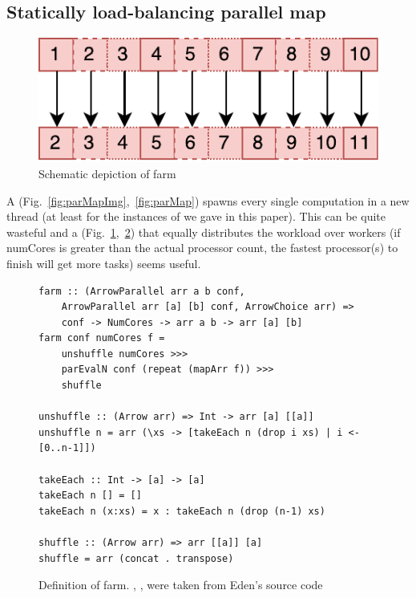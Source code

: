 \subsection{Statically load-balancing parallel map}
\begin{figure}[h]
	\includegraphics[scale=0.7]{images/farm}
	\caption{Schematic depiction of farm}
	\label{fig:farmImg}
\end{figure}
A  (Fig.~\ref{fig:parMapImg},~\ref{fig:parMap}) spawns every single computation in a new thread (at least for the instances of  we gave in this paper). This can be quite wasteful and a  (Fig.~\ref{fig:farmImg},~\ref{fig:farm}) that equally distributes the workload over  workers (if numCores is greater than the actual processor count, the fastest processor(s) to finish will get more tasks) seems useful.
\begin{figure}[h]
\begin{lstlisting}[frame=htrbl]
farm :: (ArrowParallel arr a b conf,
	ArrowParallel arr [a] [b] conf, ArrowChoice arr) =>
	conf -> NumCores -> arr a b -> arr [a] [b]
farm conf numCores f =
	unshuffle numCores >>>
	parEvalN conf (repeat (mapArr f)) >>>
	shuffle

unshuffle :: (Arrow arr) => Int -> arr [a] [[a]]
unshuffle n = arr (\xs -> [takeEach n (drop i xs) | i <- [0..n-1]])

takeEach :: Int -> [a] -> [a]
takeEach n [] = []
takeEach n (x:xs) = x : takeEach n (drop (n-1) xs)

shuffle :: (Arrow arr) => arr [[a]] [a]
shuffle = arr (concat . transpose)
\end{lstlisting}
\caption{Definition of farm. , ,  were taken from Eden's source code \cite{eden_skel_shuffle}}
\label{fig:farm}
\end{figure}

